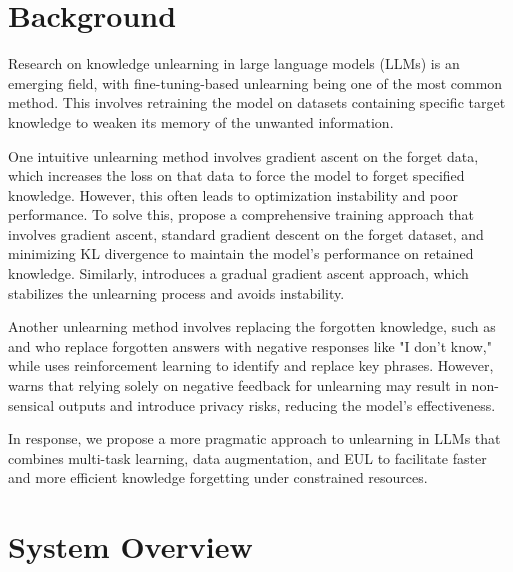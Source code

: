\documentclass[11pt]{article}
\begin{document}
\section{Background}

Research on knowledge unlearning in large language models (LLMs) is an emerging field, with fine-tuning-based unlearning being one of the most common method. This involves retraining the model on datasets containing specific target knowledge to weaken its memory of the unwanted information.

One intuitive unlearning method involves gradient ascent on the forget data, which increases the loss on that data to force the model to forget specified knowledge. However, this often leads to optimization instability and poor performance. To solve this, \citet{veldanda2024llm} propose a comprehensive training approach that involves gradient ascent, standard gradient descent on the forget dataset, and minimizing KL divergence to maintain the model’s performance on retained knowledge. Similarly, \citet{jang2022knowledge} introduces a gradual gradient ascent approach, which stabilizes the unlearning process and avoids instability. 

Another unlearning method involves replacing the forgotten knowledge, such as \citet{choi2024snap} and \citet{shi2024ulmr} who replace forgotten answers with negative responses like "I don't know," while \citet{eldan2023s} uses reinforcement learning to identify and replace key phrases. However, \citet{mekala2024alternate} warns that relying solely on negative feedback for unlearning may result in non-sensical outputs and introduce privacy risks, reducing the model's effectiveness.

In response, we propose a more pragmatic approach to unlearning in LLMs that combines multi-task learning, data augmentation, and EUL to facilitate faster and more efficient knowledge forgetting under constrained resources.



\section{System Overview}
\end{document}
